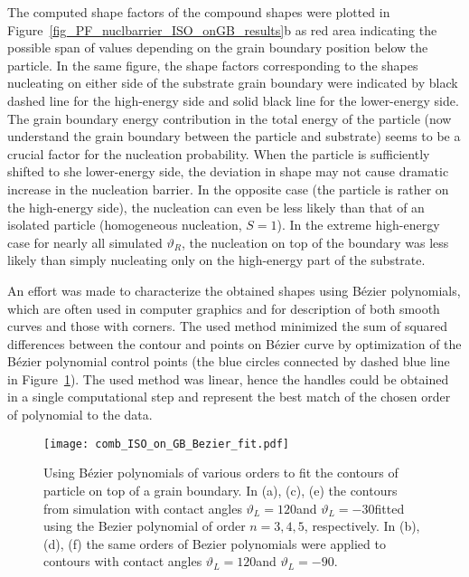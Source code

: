 The computed shape factors of the compound shapes were plotted in Figure~\ref{fig_PF_nuclbarrier_ISO_onGB_results}b as red area indicating the possible span of values depending on the grain boundary position below the particle. In the same figure, the shape factors corresponding to the shapes nucleating on either side of the substrate grain boundary were indicated by black dashed line for the high-energy side and solid black line for the lower-energy side. The grain boundary energy contribution in the total energy of the particle (now understand the grain boundary between the particle and substrate) seems to be a crucial factor for the nucleation probability. When the particle is sufficiently shifted to she lower-energy side, the deviation in shape may not cause dramatic increase in the nucleation barrier. In the opposite case (the particle is rather on the high-energy side), the nucleation can even be less likely than that of an isolated particle (homogeneous nucleation, $S=1$). In the extreme high-energy case for nearly all simulated $\vartheta_R$, the nucleation on top of the boundary was less likely than simply nucleating only on the high-energy part of the substrate. 

An effort was made to characterize the obtained shapes using Bézier polynomials, which are often used in computer graphics and for description of both smooth curves and those with corners. The used method minimized the sum of squared differences between the contour and points on Bézier curve by optimization of the Bézier polynomial control points (the blue circles connected by dashed blue line in Figure~\ref{fig_ISO_on_GB_Bezier_fit}). The used method was linear, hence the handles could be obtained in a single computational step and represent the best match of the chosen order of polynomial to the data.

\begin{figure}
	\centering
	\texttt{[image: comb\_ISO\_on\_GB\_Bezier\_fit.pdf]}
	\caption[Fit of the final PF contours using Bézier polynomials]{Using Bézier polynomials of various orders to fit the contours of particle on top of a grain boundary. In (a), (c), (e) the contours from simulation with contact angles $\vartheta_L=120$\textdegree and $\vartheta_L=-30$\textdegree fitted using the Bezier polynomial of order $n=3,4,5$, respectively. In (b), (d), (f) the same orders of Bezier polynomials were applied to contours with contact angles $\vartheta_L=120$\textdegree and $\vartheta_L=-90$\textdegree.}
	\label{fig_ISO_on_GB_Bezier_fit}
\end{figure}

